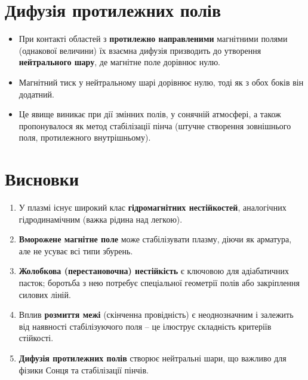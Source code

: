 \documentclass[a4paper,12pt]{article}
\begin{document}
\section{Дифузія протилежних полів}

\begin{itemize}
    \item При контакті областей з \textbf{протилежно направленими} магнітними полями (однакової величини) їх взаємна дифузія призводить до утворення \textbf{нейтрального шару}, де магнітне поле дорівнює нулю.
    \item Магнітний тиск у нейтральному шарі дорівнює нулю, тоді як з обох боків він додатний.
    \item Це явище виникає при дії змінних полів, у сонячній атмосфері, а також пропонувалося як метод стабілізації пінча (штучне створення зовнішнього поля, протилежного внутрішньому).
\end{itemize}

\section*{Висновки}

\begin{enumerate}
    \item У плазмі існує широкий клас \textbf{гідромагнітних нестійкостей}, аналогічних гідродинамічним (важка рідина над легкою).
    \item \textbf{Вморожене магнітне поле} може стабілізувати плазму, діючи як арматура, але не усуває всі типи збурень.
    \item \textbf{Жолобкова (перестановочна) нестійкість} є ключовою для адіабатичних пасток; боротьба з нею потребує спеціальної геометрії полів або закріплення силових ліній.
    \item Вплив \textbf{розмиття межі} (скінченна провідність) є неоднозначним і залежить від наявності стабілізуючого поля – це ілюструє складність критеріїв стійкості.
    \item \textbf{Дифузія протилежних полів} створює нейтральні шари, що важливо для фізики Сонця та стабілізації пінчів.
\end{enumerate}
\end{document}
